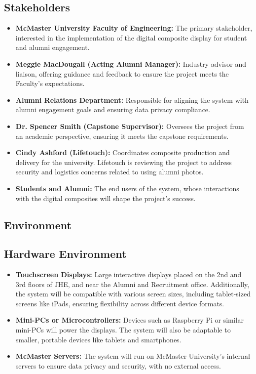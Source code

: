 \documentclass{article}
\begin{document}
\subsection{Stakeholders}
\begin{itemize}
    \item \textbf{McMaster University Faculty of Engineering:}  
    The primary stakeholder, interested in the implementation of the digital composite display for student and alumni engagement.

    \item \textbf{Meggie MacDougall (Acting Alumni Manager):}  
    Industry advisor and liaison, offering guidance and feedback to ensure the project meets the Faculty's expectations.

    \item \textbf{Alumni Relations Department:}  
    Responsible for aligning the system with alumni engagement goals and ensuring data privacy compliance.

    \item \textbf{Dr. Spencer Smith (Capstone Supervisor):}  
    Oversees the project from an academic perspective, ensuring it meets the capstone requirements.

    \item \textbf{Cindy Ashford (Lifetouch):}  
    Coordinates composite production and delivery for the university. Lifetouch is reviewing the project to address security and logistics concerns related to using alumni photos.

    \item \textbf{Students and Alumni:}  
    The end users of the system, whose interactions with the digital composites will shape the project's success.
\end{itemize}
\subsection{Environment}

\subsection*{Hardware Environment}
\begin{itemize}
    \item \textbf{Touchscreen Displays:}  
    Large interactive displays placed on the 2nd and 3rd floors of JHE, and near the Alumni and Recruitment office. Additionally, the system will be compatible with various screen sizes, including tablet-sized screens like iPads, ensuring flexibility across different device formats.

    \item \textbf{Mini-PCs or Microcontrollers:}  
    Devices such as Raspberry Pi or similar mini-PCs will power the displays. The system will also be adaptable to smaller, portable devices like tablets and smartphones.

    \item \textbf{McMaster Servers:}  
    The system will run on McMaster University’s internal servers to ensure data privacy and security, with no external access.
\end{itemize}
\end{document}
